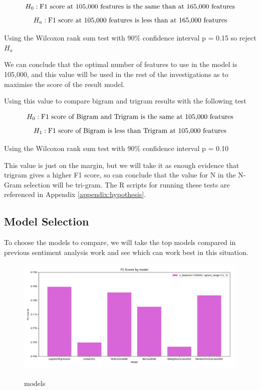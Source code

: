 $$H_0: \textnormal{F1 score at 105,000 features is the same than at 165,000 features} $$
$$H_a: \textnormal{F1 score at 105,000 features is less than at 165,000 features}$$

Using the Wilcoxon rank sum test with 90\% confidence interval 
p = 0.15 so reject $H_a$


We can conclude that the optimal number of features to use in the model is 105,000, and this value will be used in the rest of the investigations as to maximise the score of the result model.



Using this value to compare bigram and trigram results with the following test 

$$ H_0: \textnormal{F1 score of Bigram and Trigram is the same at 105,000 features} $$
$$ H_1: \textnormal{F1 score of Bigram is less than Trigram at 105,000 features} $$

Using the Wilcoxon rank sum test with 90\% confidence interval 
p = 0.10

This value is just on the margin, but we will take it as enough evidence that trigram gives a higher F1 score, so can conclude that the value for N in the N-Gram selection will be tri-gram. The R scripts for running these tests are referenced in Appendix
\ref{appendix:hypothesis}.

\pagebreak

\subsection{Model Selection}

To choose the models to compare, we will take the top models compared in previous sentiment analysis work \cite{towardsDS} and see which can work best in this situation.

\begin{figure}[h]
\caption{models}
\centering
\includegraphics[scale=0.5]{graphs/models.png}
\label{model:graph}
\end{figure}


